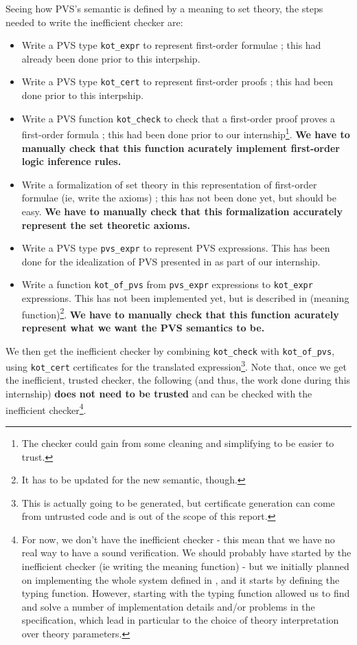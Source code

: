 \documentclass[utf8,a4paper]{article}
\begin{document}
Seeing how PVS's semantic is defined by a meaning to set theory, the
steps needed to write the inefficient checker are:
\begin{itemize}
\item Write a PVS type \verb!kot_expr! to represent first-order formulae ; this had
  already been done prior to this interpship.
\item Write a PVS type \verb!kot_cert! to represent first-order proofs
  ; this had been done prior to this interpship.
\item Write a PVS function \verb!kot_check! to check that a
  first-order proof proves a first-order formula ; this had been done
  prior to our internship\footnote{The checker could gain from some
    cleaning and simplifying to be easier to trust.}. \textbf{We have
    to manually check that this function acurately implement
    first-order logic inference rules.}
\item Write a formalization of set theory in this representation of
  first-order formulae (ie, write the axioms) ; this has not been done
  yet, but should be easy. \textbf{We have to manually check that this
    formalization accurately represent the set theoretic axioms.}
\item Write a PVS type \verb!pvs_expr! to represent PVS
  expressions. This has been done for the idealization of PVS
  presented in  as part of our internship.
\item Write a function \verb!kot_of_pvs! from \verb!pvs_expr!
  expressions to \verb!kot_expr! expressions. This has not been
  implemented yet, but is described in \cite{PVS-Semantics:TR}
  (meaning function)\footnote{It has to be updated for the new
    semantic, though.}. \textbf{We have to manually check that this
    function acurately represent what we want the PVS semantics to
    be.}
\end{itemize}

We then get the inefficient checker by combining \verb!kot_check! with
\verb!kot_of_pvs!, using \verb!kot_cert! certificates for the
translated expression\footnote{This is actually going to be generated,
  but certificate generation can come from untrusted code and is out
  of the scope of this report.}. Note that, once we get the
inefficient, trusted checker, the following (and thus, the work done
during this internship) \textbf{does not need to be trusted} and can
be checked with the inefficient checker\footnote{For now, we don't
  have the inefficient checker - this mean that we have no real way to
  have a sound verification. We should probably have started by the
  inefficient checker (ie writing the meaning function) - but we
  initially planned on implementing the whole system defined in
  \cite{PVS-Semantics:TR}, and it starts by defining the typing
  function. However, starting with the typing function allowed us to
  find and solve a number of implementation details and/or problems in
  the specification, which lead in particular to the choice of theory
  interpretation over theory parameters.}.
\end{document}
